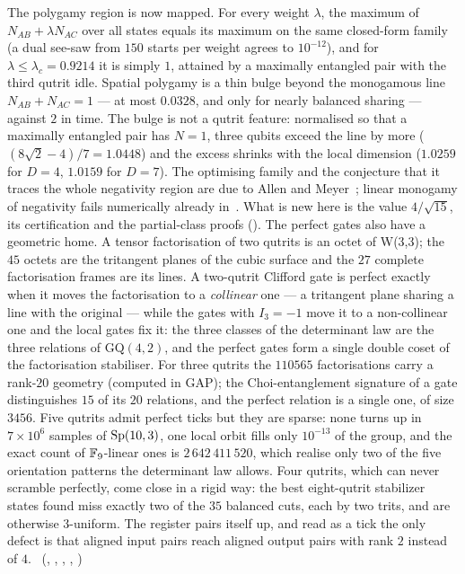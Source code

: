 The polygamy region is now mapped. For every weight $\lambda$, the maximum of $N_{AB}+\lambda N_{AC}$ over all states
equals its maximum on the same closed-form family (a dual see-saw from $150$ starts per weight agrees to $10^{-12}$), and
for $\lambda\le\lambda_c=0.9214$ it is simply $1$, attained by a maximally entangled pair with the third qutrit idle.
Spatial polygamy is a thin bulge beyond the monogamous line $N_{AB}+N_{AC}=1$ --- at most $0.0328$, and only for nearly
balanced sharing --- against $2$ in time. The bulge is not a qutrit feature: normalised so that a maximally entangled
pair has $N=1$, three qubits exceed the line by more ($(8\sqrt2-4)/7=1.0448$) and the excess shrinks with the local
dimension ($1.0259$ for $D=4$, $1.0159$ for $D=7$). The optimising family and the conjecture that it traces the whole
negativity region are due to Allen and Meyer~\cite{AllenMeyer2017}; linear monogamy of negativity fails numerically
already in~\cite{HeVidal2015}. What is new here is the value $4/\sqrt{15}$, its certification and the partial-class
proofs (). The perfect gates also have a geometric home. A tensor factorisation of two
qutrits is an octet of W(3,3); the $45$ octets are the tritangent planes of the cubic surface and the $27$ complete
factorisation frames are its lines. A two-qutrit Clifford gate is perfect exactly when it moves the factorisation to a
\emph{collinear} one --- a tritangent plane sharing a line with the original --- while the gates with $I_3=-1$ move it
to a non-collinear one and the local gates fix it: the three classes of the determinant law are the three relations of
$\mathrm{GQ}(4,2)$, and the perfect gates form a single double coset of the factorisation stabiliser. For three qutrits
the $110565$ factorisations carry a rank-$20$ geometry (computed in GAP); the Choi-entanglement signature of a gate
distinguishes $15$ of its $20$ relations, and the perfect relation is a single one, of size $3456$. Five qutrits admit perfect ticks but they are sparse: none turns up in $7\times10^6$ samples of $\mathrm{Sp}(10,3)$, one local
orbit fills only $10^{-13}$ of the group, and the exact count of $\mathbb{F}_9$-linear ones is $2\,642\,411\,520$, which realise
only two of the five orientation patterns the determinant law allows. Four qutrits, which can never scramble perfectly, come close in a rigid way: the best eight-qutrit stabilizer states
found miss exactly two of the $35$ balanced cuts, each by two trits, and are otherwise $3$-uniform. The register pairs
itself up, and read as a tick the only defect is that aligned input pairs reach aligned output pairs with rank $2$
instead of $4$.
\tierC\ (, ,
, ,
)

